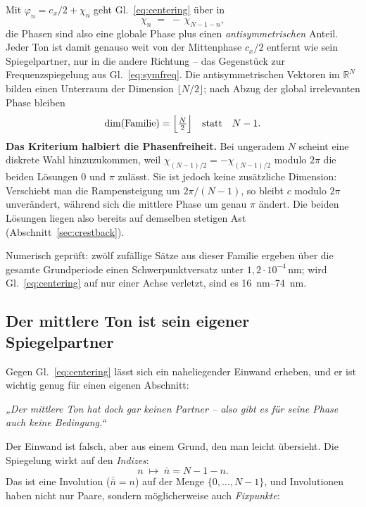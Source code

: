 \documentclass[11pt,a4paper]{article}
\begin{document}
Mit $\varphi_n = c_x/2 + \chi_n$ geht Gl.~\eqref{eq:centering} über in
\begin{equation}
  \chi_n \;=\; -\,\chi_{N-1-n},
  \label{eq:antisym}
\end{equation}
die Phasen sind also eine globale Phase plus einen \emph{antisymmetrischen}
Anteil. Jeder Ton ist damit genauso weit von der Mittenphase $c_x/2$ entfernt
wie sein Spiegelpartner, nur in die andere Richtung -- das Gegenstück zur
Frequenzspiegelung aus Gl.~\eqref{eq:symfreq}. Die antisymmetrischen Vektoren
im $\mathbb{R}^N$ bilden einen Unterraum der Dimension $\lfloor N/2\rfloor$;
nach Abzug der global irrelevanten Phase bleiben
\begin{equation}
  \dim(\text{Familie}) = \Bigl\lfloor \tfrac{N}{2} \Bigr\rfloor
  \quad\text{statt}\quad
  N-1 .
\end{equation}
\textbf{Das Kriterium halbiert die Phasenfreiheit.} Bei ungeradem $N$
scheint eine diskrete Wahl hinzuzukommen, weil
$\chi_{(N-1)/2}=-\chi_{(N-1)/2}$ modulo $2\pi$ die beiden Lösungen $0$ und
$\pi$ zulässt. Sie ist jedoch keine zusätzliche Dimension: Verschiebt man die
Rampensteigung um $2\pi/(N-1)$, so bleibt $c$ modulo $2\pi$ unverändert,
während sich die mittlere Phase um genau $\pi$ ändert. Die beiden Lösungen
liegen also bereits auf demselben stetigen Ast
(Abschnitt~\ref{sec:crestback}).

Numerisch geprüft: zwölf zufällige Sätze aus dieser Familie ergeben über die
gesamte Grundperiode einen Schwerpunktversatz unter
$1{,}2\cdot10^{-4}\,\mathrm{nm}$; wird Gl.~\eqref{eq:centering} auf nur einer
Achse verletzt, sind es \SIrange{16}{74}{\nano\meter}.

\subsection{Der mittlere Ton ist sein eigener Spiegelpartner}
\label{sec:selfpair}

Gegen Gl.~\eqref{eq:centering} lässt sich ein naheliegender Einwand
erheben, und er ist wichtig genug für einen eigenen Abschnitt:

\begin{center}
\emph{„Der mittlere Ton hat doch gar keinen Partner -- also gibt es für
seine Phase auch keine Bedingung.``}
\end{center}

\noindent Der Einwand ist falsch, aber aus einem Grund, den man leicht
übersieht. Die Spiegelung wirkt auf den \emph{Indizes}:
\begin{equation}
  n \;\longmapsto\; \bar n = N-1-n .
\end{equation}
Das ist eine Involution ($\bar{\bar n} = n$) auf der Menge
$\{0,\dots,N-1\}$, und Involutionen haben nicht nur Paare, sondern
möglicherweise auch \emph{Fixpunkte}:
\end{document}
